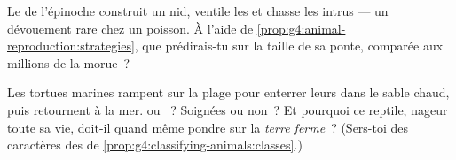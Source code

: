 \begin{exercise}[$\star\star$]\label{exo:g4:animal-reproduction:10}
Le  de l'épinoche construit un nid, ventile les  et chasse
les intrus --- un dévouement rare chez un poisson. À l'aide de
\cref{prop:g4:animal-reproduction:strategies}, que prédirais-tu sur
la taille de sa ponte, comparée aux millions de la morue~?
\end{exercise}

\begin{exercise}[$\star\star\star$]\label{exo:g4:animal-reproduction:11}
Les tortues marines rampent sur la plage pour enterrer leurs 
dans le sable chaud, puis retournent à la mer.  ou
~? Soignées ou non~? Et pourquoi ce reptile, nageur toute
sa vie, doit-il quand même pondre sur la \emph{terre ferme}~?
(Sers-toi des caractères des  de
\cref{prop:g4:classifying-animals:classes}.)
\end{exercise}
